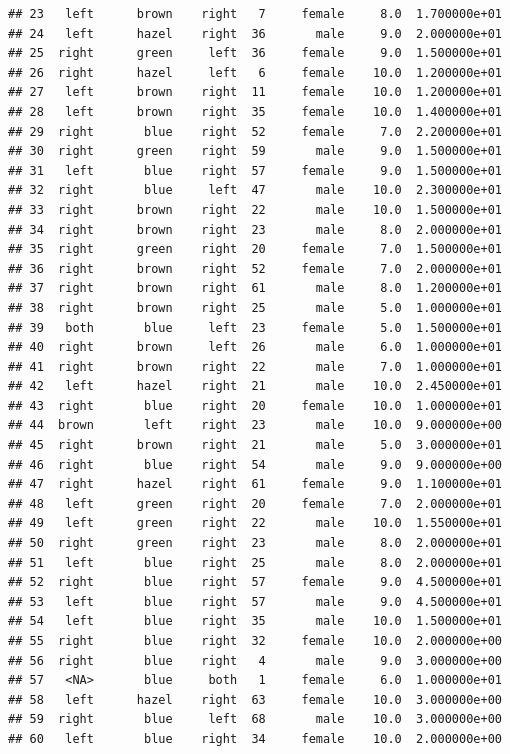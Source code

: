 \documentclass[]{article}
\begin{document}
\begin{verbatim}
## 23   left      brown    right   7     female     8.0  1.700000e+01
## 24   left      hazel    right  36       male     9.0  2.000000e+01
## 25  right      green     left  36     female     9.0  1.500000e+01
## 26  right      hazel     left   6     female    10.0  1.200000e+01
## 27   left      brown    right  11     female    10.0  1.200000e+01
## 28   left      brown    right  35     female    10.0  1.400000e+01
## 29  right       blue    right  52     female     7.0  2.200000e+01
## 30  right      green    right  59       male     9.0  1.500000e+01
## 31   left       blue    right  57     female     9.0  1.500000e+01
## 32  right       blue     left  47       male    10.0  2.300000e+01
## 33  right      brown    right  22       male    10.0  1.500000e+01
## 34  right      brown    right  23       male     8.0  2.000000e+01
## 35  right      green    right  20     female     7.0  1.500000e+01
## 36  right      brown    right  52     female     7.0  2.000000e+01
## 37  right      brown    right  61       male     8.0  1.200000e+01
## 38  right      brown    right  25       male     5.0  1.000000e+01
## 39   both       blue     left  23     female     5.0  1.500000e+01
## 40  right      brown     left  26       male     6.0  1.000000e+01
## 41  right      brown    right  22       male     7.0  1.000000e+01
## 42   left      hazel    right  21       male    10.0  2.450000e+01
## 43  right       blue    right  20     female    10.0  1.000000e+01
## 44  brown       left    right  23       male    10.0  9.000000e+00
## 45  right      brown    right  21       male     5.0  3.000000e+01
## 46  right       blue    right  54       male     9.0  9.000000e+00
## 47  right      hazel    right  61     female     9.0  1.100000e+01
## 48   left      green    right  20     female     7.0  2.000000e+01
## 49   left      green    right  22       male    10.0  1.550000e+01
## 50  right      green    right  23       male     8.0  2.000000e+01
## 51   left       blue    right  25       male     8.0  2.000000e+01
## 52  right       blue    right  57     female     9.0  4.500000e+01
## 53   left       blue    right  57       male     9.0  4.500000e+01
## 54   left       blue    right  35       male    10.0  1.500000e+01
## 55  right       blue    right  32     female    10.0  2.000000e+00
## 56  right       blue    right   4       male     9.0  3.000000e+00
## 57   <NA>       blue     both   1     female     6.0  1.000000e+01
## 58   left      hazel    right  63     female    10.0  3.000000e+00
## 59  right       blue     left  68       male    10.0  3.000000e+00
## 60   left       blue    right  34     female    10.0  2.000000e+00

\end{verbatim}
\end{document}
